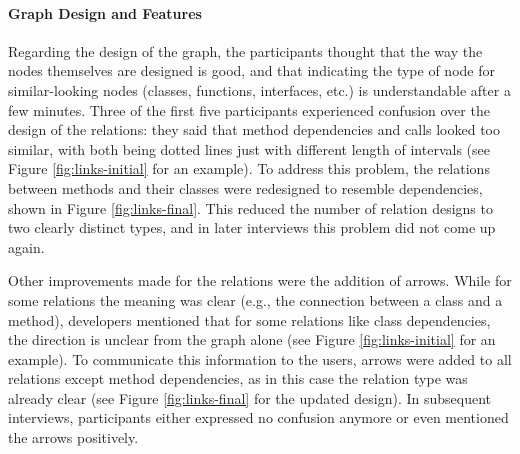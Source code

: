 \documentclass[a4paper,11pt,twoside]{article}
\theoremstyle{definition} %
\begin{document}
\paragraph{Graph Design and Features} \label{Par:GraphDesignFeatures}

Regarding the design of the graph, the participants thought that the way the nodes themselves are designed is good, and that indicating the type of node for similar-looking nodes (classes, functions, interfaces, etc.) is understandable after a few minutes. Three of the first five participants experienced confusion over the design of the relations: they said that method dependencies and calls looked too similar, with both being dotted lines just with different length of intervals (see Figure \ref{fig:links-initial} for an example). To address this problem, the relations between methods and their classes were redesigned to resemble dependencies, shown in Figure \ref{fig:links-final}. This reduced the number of relation designs to two clearly distinct types, and in later interviews this problem did not come up again. 

Other improvements made for the relations were the addition of arrows. While for some relations the meaning was clear (e.g., the connection between a class and a method), developers mentioned that for some relations like class dependencies, the direction is unclear from the graph alone (see Figure \ref{fig:links-initial} for an example). To communicate this information to the users, arrows were added to all relations except method dependencies, as in this case the relation type was already clear (see Figure \ref{fig:links-final} for the updated design). In subsequent interviews, participants either expressed no confusion anymore or even mentioned the arrows positively. 
\end{document}
